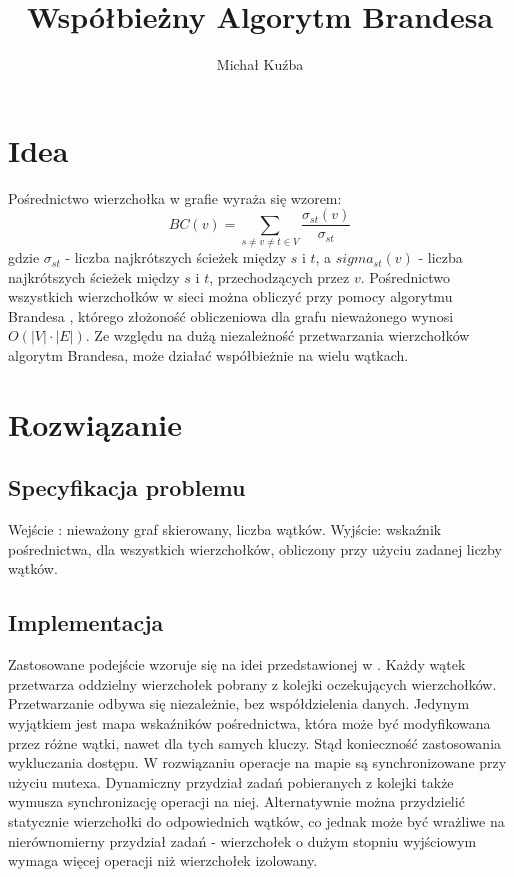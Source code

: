 \documentclass[]{article}
\title{Współbieżny Algorytm Brandesa}
\author{Michał Kuźba}
\begin{document}
\maketitle

\section{Idea}
Pośrednictwo wierzchołka w grafie wyraża się wzorem:
\[BC(v) = \sum_{s\neq v\neq t \in V}^{} \frac{\sigma_{st}(v)}{\sigma_{st}}\]
gdzie \(\sigma_{st}\) - liczba najkrótszych ścieżek między \(s\) i \(t\),
a \(sigma_{st}(v)\) - liczba najkrótszych ścieżek między \(s\) i \(t\), przechodzących przez \(v\).
Pośrednictwo wszystkich wierzchołków w sieci można obliczyć przy pomocy algorytmu Brandesa \parencite{brandes:01}, którego złożoność obliczeniowa dla grafu nieważonego wynosi \(O(|V|\cdot|E|)\).
Ze względu na dużą niezależność przetwarzania wierzchołków algorytm Brandesa, może działać współbieżnie na wielu wątkach.

\section{Rozwiązanie}
\subsection{Specyfikacja problemu}
Wejście : nieważony graf skierowany, liczba wątków.\newline
Wyjście: wskaźnik pośrednictwa, dla wszystkich wierzchołków, obliczony przy użyciu zadanej liczby wątków.

\subsection{Implementacja}
Zastosowane podejście wzoruje się na idei przedstawionej w \parencite[p. 539-550]{bader:06}. Każdy wątek przetwarza oddzielny wierzchołek pobrany z kolejki oczekujących wierzchołków. Przetwarzanie odbywa się niezależnie, bez współdzielenia danych. Jedynym wyjątkiem jest mapa wskaźników pośrednictwa, która może być modyfikowana przez różne wątki, nawet dla tych samych kluczy. Stąd konieczność zastosowania wykluczania dostępu. W rozwiązaniu operacje na mapie są synchronizowane przy użyciu mutexa. Dynamiczny przydział zadań pobieranych z kolejki także wymusza synchronizację operacji na niej. \newline
Alternatywnie można przydzielić statycznie wierzchołki do odpowiednich wątków, co jednak może być wrażliwe na nierównomierny przydział zadań - wierzchołek o dużym stopniu wyjściowym wymaga więcej operacji niż wierzchołek izolowany.
\end{document}
